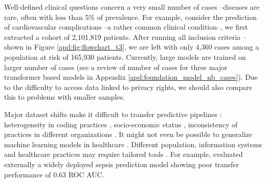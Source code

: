 \documentclass[french,12pt,twoside,a4paper]{book}
\begin{document}

Well-defined clinical questions concern a very small number of cases --diseases
are rare, often with less than 5\% of prevalence. For example, consider the
prediction of cardiovascular complications --a rather common clinical
condition--, we first extracted a cohort of 2,101,819 patients. After running
all inclusion criteria --shown in Figure \ref{apd:fig:flowchart_t3}, we are left
with only 4,360 cases among a population at risk of 165,930 patients. Currently,
large models are trained on larger number of cases (see a review of number of
cases for three major transformer based models in Appendix
\ref{apd:foundation_model_nb_cases}). Due to the difficulty to access data
linked to privacy rights, we should also compare this to problems with
smaller samples.

Major dataset shifts make it difficult to transfer predictive
pipelines \citep{finlayson2021clinician}: heterogeneity in coding practices \citep{juven2013codage},
socio-economic status \citep{gianfrancesco2018potential}, inconsistency of
practices in different organizations \citep{agniel2018biases}.
It might not even be possible to generalize machine learning models in
healthcare \citep{futoma2020myth}. Different population, information systems and
healthcare practices may require tailored tools \citep{rose2018}. For example,
\cite{wong2021external} evaluated externally a widely deployed sepsis prediction
model showing poor transfer performance of 0.63 ROC AUC.
\end{document}
